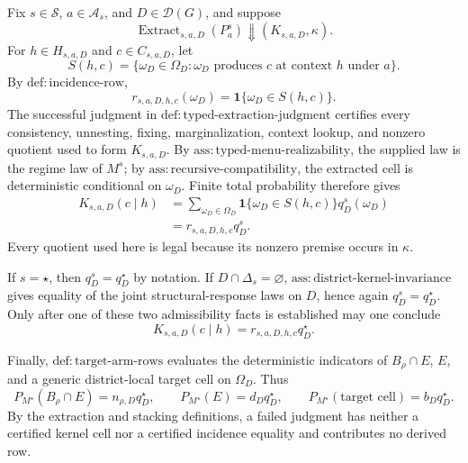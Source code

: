 Fix \(s\in\mathcal S\), \(a\in\mathcal A_s\), and \(D\in\mathcal D(G)\), and suppose
\[
\operatorname{Extract}_{s,a,D}(P_a^s)\Downarrow(K_{s,a,D},\kappa).
\]
For \(h\in H_{s,a,D}\) and \(c\in C_{s,a,D}\), let
\[
S(h,c)=\{\omega_D\in\Omega_D:\omega_D\text{ produces }c
\text{ at context }h\text{ under }a\}.
\]
By \(\mathrm{def:incidence\text{-}row}\),
\[
r_{s,a,D,h,c}(\omega_D)=\mathbf 1\{\omega_D\in S(h,c)\}.
\]
The successful judgment in \(\mathrm{def:typed\text{-}extraction\text{-}judgment}\) certifies every consistency, unnesting, fixing, marginalization, context lookup, and nonzero quotient used to form \(K_{s,a,D}\). By \(\mathrm{ass:typed\text{-}menu\text{-}realizability}\), the supplied law is the regime law of \(M^s\); by \(\mathrm{ass:recursive\text{-}compatibility}\), the extracted cell is deterministic conditional on \(\omega_D\). Finite total probability therefore gives
\[
\begin{aligned}
K_{s,a,D}(c\mid h)
&=\sum_{\omega_D\in\Omega_D}
\mathbf 1\{\omega_D\in S(h,c)\}q_D^s(\omega_D)\\
&=r_{s,a,D,h,c}q_D^s.
\end{aligned}
\]
Every quotient used here is legal because its nonzero premise occurs in \(\kappa\).

If \(s=\star\), then \(q_D^s=q_D^\star\) by notation. If \(D\cap\Delta_s=\varnothing\), \(\mathrm{ass:district\text{-}kernel\text{-}invariance}\) gives equality of the joint structural-response laws on \(D\), hence again \(q_D^s=q_D^\star\). Only after one of these two admissibility facts is established may one conclude
\[
K_{s,a,D}(c\mid h)=r_{s,a,D,h,c}q_D^\star.
\]

Finally, \(\mathrm{def:target\text{-}arm\text{-}rows}\) evaluates the deterministic indicators of \(B_\rho\cap E\), \(E\), and a generic district-local target cell on \(\Omega_D\). Thus
\[
P_{M^\star}(B_\rho\cap E)=n_{\rho,D}q_D^\star,
\qquad
P_{M^\star}(E)=d_Dq_D^\star,
\qquad
P_{M^\star}(\text{target cell})=b_Dq_D^\star.
\]
By the extraction and stacking definitions, a failed judgment has neither a certified kernel cell nor a certified incidence equality and contributes no derived row.